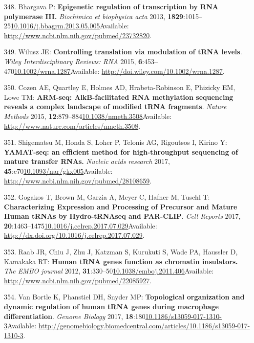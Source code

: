 \documentclass[
]{book}
\begin{document}
\leavevmode\hypertarget{ref-Park2017}{}%
348. Bhargava P: \textbf{Epigenetic regulation of transcription by RNA polymerase III.} \emph{Biochimica et biophysica acta} 2013, \textbf{1829}:1015--25\href{https://doi.org/10.1016/j.bbagrm.2013.05.005}{10.1016/j.bbagrm.2013.05.005}Available: \url{http://www.ncbi.nlm.nih.gov/pubmed/23732820}.

\leavevmode\hypertarget{ref-Wilusz2015}{}%
349. Wilusz JE: \textbf{Controlling translation via modulation of tRNA levels}. \emph{Wiley Interdisciplinary Reviews: RNA} 2015, \textbf{6}:453--470\href{https://doi.org/10.1002/wrna.1287}{10.1002/wrna.1287}Available: \url{http://doi.wiley.com/10.1002/wrna.1287}.

\leavevmode\hypertarget{ref-Cozen2015}{}%
350. Cozen AE, Quartley E, Holmes AD, Hrabeta-Robinson E, Phizicky EM, Lowe TM: \textbf{ARM-seq: AlkB-facilitated RNA methylation sequencing reveals a complex landscape of modified tRNA fragments}. \emph{Nature Methods} 2015, \textbf{12}:879--884\href{https://doi.org/10.1038/nmeth.3508}{10.1038/nmeth.3508}Available: \url{http://www.nature.com/articles/nmeth.3508}.

\leavevmode\hypertarget{ref-Shigematsu2017a}{}%
351. Shigematsu M, Honda S, Loher P, Telonis AG, Rigoutsos I, Kirino Y: \textbf{YAMAT-seq: an efficient method for high-throughput sequencing of mature transfer RNAs.} \emph{Nucleic acids research} 2017, \textbf{45}:e70\href{https://doi.org/10.1093/nar/gkx005}{10.1093/nar/gkx005}Available: \url{http://www.ncbi.nlm.nih.gov/pubmed/28108659}.

\leavevmode\hypertarget{ref-Gogakos2017}{}%
352. Gogakos T, Brown M, Garzia A, Meyer C, Hafner M, Tuschl T: \textbf{Characterizing Expression and Processing of Precursor and Mature Human tRNAs by Hydro-tRNAseq and PAR-CLIP}. \emph{Cell Reports} 2017, \textbf{20}:1463--1475\href{https://doi.org/10.1016/j.celrep.2017.07.029}{10.1016/j.celrep.2017.07.029}Available: \url{http://dx.doi.org/10.1016/j.celrep.2017.07.029}.

\leavevmode\hypertarget{ref-Raab2011}{}%
353. Raab JR, Chiu J, Zhu J, Katzman S, Kurukuti S, Wade PA, Haussler D, Kamakaka RT: \textbf{Human tRNA genes function as chromatin insulators.} \emph{The EMBO journal} 2012, \textbf{31}:330--50\href{https://doi.org/10.1038/emboj.2011.406}{10.1038/emboj.2011.406}Available: \url{http://www.ncbi.nlm.nih.gov/pubmed/22085927}.

\leavevmode\hypertarget{ref-VanBortle2017}{}%
354. Van Bortle K, Phanstiel DH, Snyder MP: \textbf{Topological organization and dynamic regulation of human tRNA genes during macrophage differentiation}. \emph{Genome Biology} 2017, \textbf{18}:180\href{https://doi.org/10.1186/s13059-017-1310-3}{10.1186/s13059-017-1310-3}Available: \url{http://genomebiology.biomedcentral.com/articles/10.1186/s13059-017-1310-3}.
\end{document}
